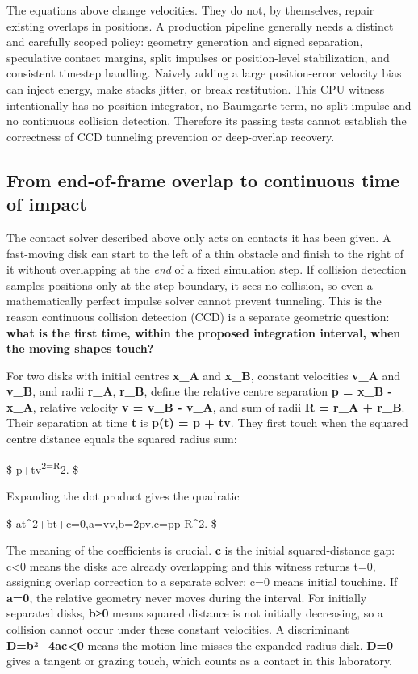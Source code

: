 The equations above change velocities. They do not, by themselves, repair existing overlaps in positions. A production pipeline generally needs a distinct and carefully scoped policy: geometry generation and signed separation, speculative contact margins, split impulses or position-level stabilization, and consistent timestep handling. Naively adding a large position-error velocity bias can inject energy, make stacks jitter, or break restitution. This CPU witness intentionally has no position integrator, no Baumgarte term, no split impulse and no continuous collision detection. Therefore its passing tests cannot establish the correctness of CCD tunneling prevention or deep-overlap recovery.

\subsection{From end-of-frame overlap to continuous time of impact}\label{appendix-c9d92e145503-from-end-of-frame-overlap-to-continuous-time-of-impact}

The contact solver described above only acts on contacts it has been given. A fast-moving disk can start to the left of a thin obstacle and finish to the right of it without overlapping at the \emph{end} of a fixed simulation step. If collision detection samples positions only at the step boundary, it sees no collision, so even a mathematically perfect impulse solver cannot prevent tunneling. This is the reason continuous collision detection (CCD) is a separate geometric question: \textbf{what is the first time, within the proposed integration interval, when the moving shapes touch?}

For two disks with initial centres \textbf{x\_A} and \textbf{x\_B}, constant velocities \textbf{v\_A} and \textbf{v\_B}, and radii \textbf{r\_A}, \textbf{r\_B}, define the relative centre separation \textbf{p = x\_B - x\_A}, relative velocity \textbf{v = v\_B - v\_A}, and sum of radii \textbf{R = r\_A + r\_B}. Their separation at time \textbf{t} is \textbf{p(t) = p + tv}. They first touch when the squared centre distance equals the squared radius sum:

\$ \lVert \mathbf p+t\mathbf v\rVert\textsuperscript{2=R}2. \$

Expanding the dot product gives the quadratic

\$ at\^{}2+bt+c=0,\qquad a=\mathbf v\cdot\mathbf v,\quad b=2\mathbf p\cdot\mathbf v,\quad c=\mathbf p\cdot\mathbf p-R\^{}2. \$

The meaning of the coefficients is crucial. \textbf{c} is the initial squared-distance gap: c\textless0 means the disks are already overlapping and this witness returns t=0, assigning overlap correction to a separate solver; c=0 means initial touching. If \textbf{a=0}, the relative geometry never moves during the interval. For initially separated disks, \textbf{b≥0} means squared distance is not initially decreasing, so a collision cannot occur under these constant velocities. A discriminant \textbf{D=b²−4ac\textless0} means the motion line misses the expanded-radius disk. \textbf{D=0} gives a tangent or grazing touch, which counts as a contact in this laboratory.

